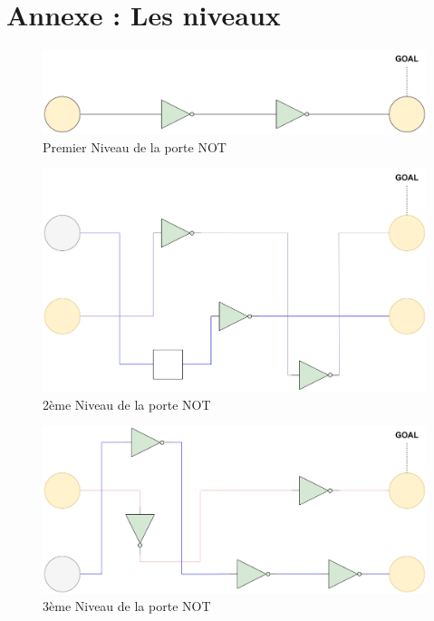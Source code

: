 \documentclass{article}
\begin{document}
\newpage
\section{Annexe : Les niveaux}
\begin{figure}[h]
    \centering
    \includegraphics[width=\textwidth]{img/Levels-NOT-1.jpg}
    \caption{Premier Niveau de la porte NOT}
\end{figure}

\begin{figure}[h]
    \centering
    \includegraphics[width=\textwidth]{img/Levels-NOT-2.jpg}
    \caption{2ème Niveau de la porte NOT}
\end{figure}
\begin{figure}[h]
    \centering
    \includegraphics[width=\textwidth]{img/Levels-NOT-3.jpg}
    \caption{3ème Niveau de la porte NOT}
\end{figure}
\end{document}
